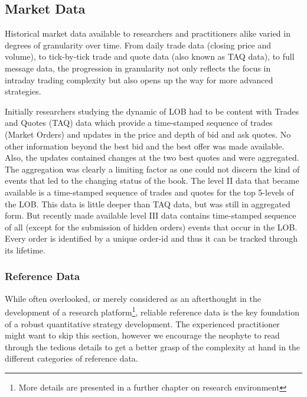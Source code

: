 \subsection{Market Data}



Historical market data available to researchers and practitioners alike varied in degrees of granularity over time. From daily trade data (closing price and volume), to tick-by-tick trade and quote data (also known as TAQ data), to full message data, the progression in granularity not only reflects the focus in intraday trading complexity but also opens up the way for more advanced strategies. 


Initially researchers studying the dynamic of LOB had to be content with Trades and Quotes (TAQ) data which provide a time-stamped sequence of trades (Market Orders) and updates in the price and depth of bid and ask quotes. No other information beyond the best bid and the best offer was made available. Also, the updates contained changes at the two best quotes and were aggregated. The aggregation was clearly a limiting factor as one could not discern the kind of events that led to the changing status of the book. The level II data that became available is a time-stamped sequence of trades and quotes for the top 5-levels of the LOB. This data is little deeper than TAQ data, but was still in aggregated form. But recently made available level III data contains time-stamped sequence of all (except for the submission of hidden orders) events that occur in the LOB. Every order is identified by a unique order-id and thus it can be tracked through its lifetime. \\


\subsubsection{Reference Data} 
While often overlooked, or merely considered as an afterthought in the development of a research platform\footnote{More details are presented in a further chapter on research environment}, reliable reference data is the key foundation of a robust quantitative strategy development. The experienced practitioner might want to skip this section, however we encourage the neophyte to read through the tedious details to get a better grasp of the complexity at hand in the
different categories of reference data.

